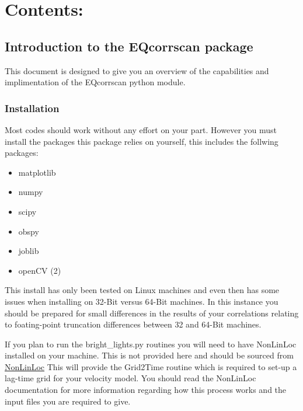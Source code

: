 \documentclass[a4paper,10pt,english]{sphinxmanual}
\begin{document}
\chapter{Contents:}
\label{index:contents}

\section{Introduction to the EQcorrscan package}
\label{intro:introduction-to-the-eqcorrscan-package}\label{intro::doc}
This document is designed to give you an overview of the capabilities and
implimentation of the EQcorrscan python module.


\subsection{Installation}
\label{intro:installation}
Most codes should work without any effort on your part.  However you must
install the packages this package relies on yourself, this includes the follwing
packages:
\begin{itemize}
\item {} 
matplotlib

\item {} 
numpy

\item {} 
scipy

\item {} 
obspy

\item {} 
joblib

\item {} 
openCV (2)

\end{itemize}

This install has only been tested on Linux machines and even then has some
issues when installing on 32-Bit versus 64-Bit machines.  In this instance you
should be prepared for small differences in the results of your correlations
relating to foating-point truncation differences between 32 and 64-Bit
machines.

If you plan to run the bright\_lights.py routines you will need to have
NonLinLoc installed on your machine.  This is not provided here and should
be sourced from \href{http://alomax.free.fr/nlloc/}{NonLinLoc} This will provide
the Grid2Time routine which is required to set-up a lag-time grid for your
velocity model.  You should read the NonLinLoc documentation for more
information regarding how this process works and the input files you are
required to give.
\end{document}
